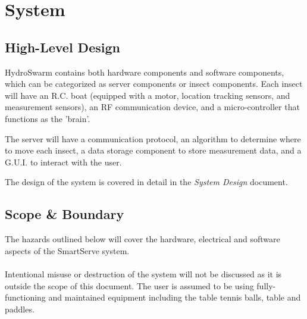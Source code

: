 \documentclass[11pt]{article}
\begin{document}
\section{System}
\subsection{High-Level Design}

HydroSwarm contains both hardware components and software components, which can be categorized as
server components or insect components. Each insect will have an R.C. boat (equipped with a motor,
location tracking sensors, and measurement sensors), an RF communication device, and a micro-controller
that functions as the 'brain'.

The server will have a communication protocol, an algorithm to determine where to move each insect,
a data storage component to store measurement data, and a G.U.I. to interact with the user.

The design of the system is covered in detail in the \textit{System Design} document.

\subsection{Scope \& Boundary}
The hazards outlined below will cover the hardware, electrical and software aspects of the SmartServe system. \\ \\
Intentional misuse or destruction of the system will not be discussed as it is outside the scope of this document. The user is assumed to be using fully-functioning and maintained equipment including the table tennis balls, table and paddles. 
\end{document}

